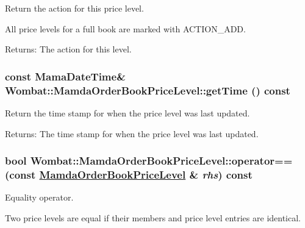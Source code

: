 Return the action for this price level. 

All price levels for a full book are marked with ACTION\_\-ADD.

\begin{Desc}
\item[Returns:]The action for this level. \end{Desc}
\hypertarget{classWombat_1_1MamdaOrderBookPriceLevel_344d4b52029e4c28fe27ae3e0729f7a6}{
\subsubsection[getTime]{\setlength{\rightskip}{0pt plus 5cm}const Mama\-Date\-Time\& Wombat::Mamda\-Order\-Book\-Price\-Level::get\-Time () const}}
\label{classWombat_1_1MamdaOrderBookPriceLevel_344d4b52029e4c28fe27ae3e0729f7a6}


Return the time stamp for when the price level was last updated. 

\begin{Desc}
\item[Returns:]The time stamp for when the price level was last updated. \end{Desc}
\hypertarget{classWombat_1_1MamdaOrderBookPriceLevel_604035ac59f06cfd410fe793b53ee4b8}{
\subsubsection[operator==]{\setlength{\rightskip}{0pt plus 5cm}bool Wombat::Mamda\-Order\-Book\-Price\-Level::operator== (const \hyperlink{classWombat_1_1MamdaOrderBookPriceLevel}{Mamda\-Order\-Book\-Price\-Level} \& {\em rhs}) const}}
\label{classWombat_1_1MamdaOrderBookPriceLevel_604035ac59f06cfd410fe793b53ee4b8}


Equality operator. 

Two price levels are equal if their members and price level entries are identical.

